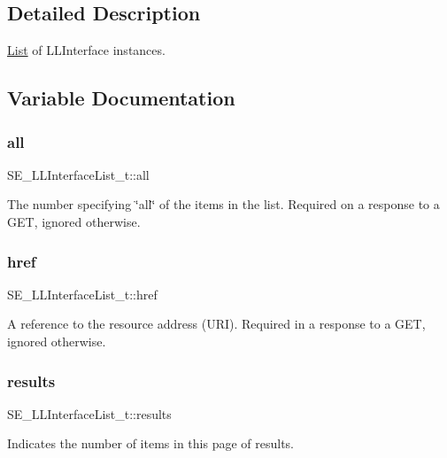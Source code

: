 \subsection{Detailed Description}
\hyperlink{structList}{List} of L\+L\+Interface instances. 

\subsection{Variable Documentation}
\mbox{\label{group__LLInterfaceList_ga3ce3494c72fc68465b2be53fb184ba19}} 
\subsubsection{\texorpdfstring{all}{all}}
{\footnotesize\ttfamily S\+E\+\_\+\+L\+L\+Interface\+List\+\_\+t\+::all}

The number specifying \char`\"{}all\char`\"{} of the items in the list. Required on a response to a G\+ET, ignored otherwise. \mbox{\label{group__LLInterfaceList_gaffb34fa53a2595c094d76738fe29e7be}} 
\subsubsection{\texorpdfstring{href}{href}}
{\footnotesize\ttfamily S\+E\+\_\+\+L\+L\+Interface\+List\+\_\+t\+::href}

A reference to the resource address (U\+RI). Required in a response to a G\+ET, ignored otherwise. \mbox{\label{group__LLInterfaceList_ga1e311149c0035e37d619f777697b2602}} 
\subsubsection{\texorpdfstring{results}{results}}
{\footnotesize\ttfamily S\+E\+\_\+\+L\+L\+Interface\+List\+\_\+t\+::results}

Indicates the number of items in this page of results. 